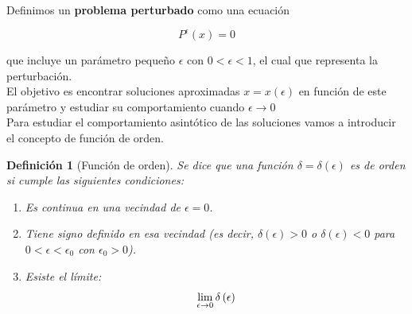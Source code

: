 \documentclass[12pt, a4paper]{report}
\newtheorem{definition}{Definición}
\begin{document}
Definimos un \textbf{problema perturbado} como una ecuación 

\begin{equation}\label{eq: problemaPerturbado}
	P^\epsilon\left(x\right)=0
\end{equation}

que incluye un parámetro pequeño $\epsilon$ con $0<\epsilon<1$, el cual que representa la perturbación.\\

El objetivo es encontrar soluciones aproximadas $x=x\left(\epsilon\right)$ en función de este parámetro y estudiar su comportamiento cuando $\epsilon\to0$\\

Para estudiar el comportamiento asintótico de las soluciones vamos a introducir el concepto de función de orden.

\begin{definition}[Función de orden]
	Se dice que una función $\delta=\delta\left(\epsilon\right)$ es de orden si cumple las siguientes condiciones:
	\begin{enumerate}
		\item Es continua en una vecindad de $\epsilon=0$.
		\item Tiene signo definido en esa vecindad (es decir, $\delta(\epsilon)>0$ o $\delta(\epsilon)<0$ para $0<\epsilon<\epsilon_0$ con $\epsilon_0>0$).
		\item Esiste el límite:
		$$\large\lim_{\epsilon\to0}\delta\left(\epsilon\right)$$
	\end{enumerate}
\end{definition}
\end{document}

